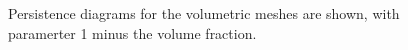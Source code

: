 
%

\begin{figure}[!htb]
\centering
{}
\hfill
{}
\caption{Persistence diagrams for the volumetric meshes are shown, with paramerter 1 minus the volume fraction.}
\label{fig:ph_diagrams}
\end{figure}